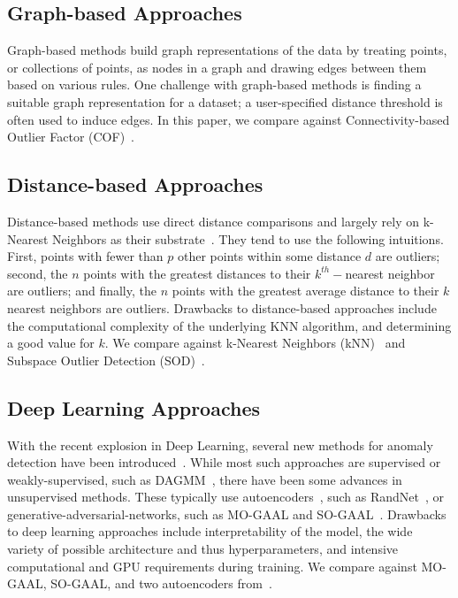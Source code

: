 \subsection{Graph-based Approaches}
\label{subsec:introduction:graph-based-approaches}

Graph-based methods build graph representations of the data by treating points, or collections of points, as nodes in a graph and drawing edges between them based on various rules.
One challenge with graph-based methods is finding a suitable graph representation for a dataset; a user-specified distance threshold is often used to induce edges.
In this paper, we compare against Connectivity-based Outlier Factor (COF)~\cite{tang2002cof}.


\subsection{Distance-based Approaches}
\label{subsec:related-works:distance-based-approaches}

Distance-based methods use direct distance comparisons and largely rely on k-Nearest Neighbors as their substrate~\cite{wang2019progress}.
They tend to use the following intuitions.
First, points with fewer than $p$ other points within some distance $d$ are outliers;
second, the $n$ points with the greatest distances to their $k^{th}-$nearest neighbor are outliers;
and finally, the $n$ points with the greatest average distance to their $k$ nearest neighbors are outliers.
Drawbacks to distance-based approaches include the computational complexity of the underlying KNN algorithm, and determining a good value for $k$.
We compare against
k-Nearest Neighbors (kNN)~\cite{ramaswamy2000efficient, fabrizio2002knn} and
Subspace Outlier Detection (SOD)~\cite{kriegel2009sod}.


\subsection{Deep Learning Approaches}
\label{subsec:related-works:deep-learning-approaches}
With the recent explosion in Deep Learning, several new methods for anomaly detection have been introduced~\cite{pang2021deep}.
While most such approaches are supervised or weakly-supervised, such as DAGMM~\cite{zong2018deep}, there have been some advances in unsupervised methods.
These typically use autoencoders~\cite{chen2017outlier}, such as RandNet~\cite{chandola2009anomaly}, or generative-adversarial-networks, such as MO-GAAL and SO-GAAL~\cite{liu2019generative}.
Drawbacks to deep learning approaches include interpretability of the model, the wide variety of possible architecture and thus hyperparameters, and intensive computational and GPU requirements during training.
We compare against MO-GAAL, SO-GAAL, and two autoencoders from~\cite{chen2017outlier}.


